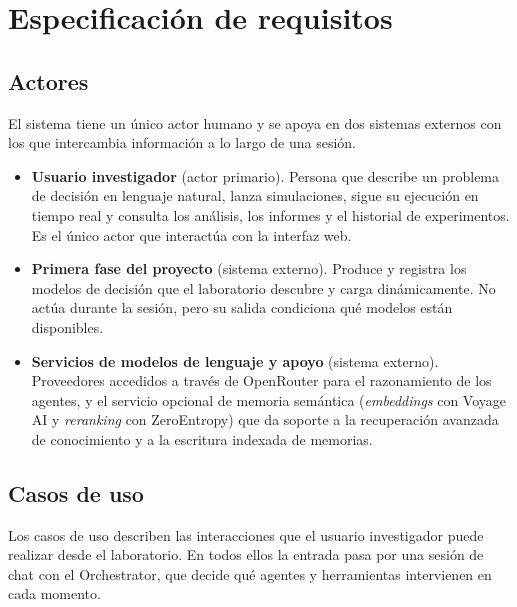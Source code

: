 \chapter{Especificación de requisitos}

\section{Actores}

El sistema tiene un único actor humano y se apoya en dos sistemas externos
con los que intercambia información a lo largo de una sesión.

\begin{itemize}
\item \textbf{Usuario investigador} (actor primario). Persona que describe
un problema de decisión en lenguaje natural, lanza simulaciones, sigue su
ejecución en tiempo real y consulta los análisis, los informes y el
historial de experimentos. Es el único actor que interactúa con la
interfaz web.
\item \textbf{Primera fase del proyecto} (sistema externo). Produce y
registra los modelos de decisión que el laboratorio descubre y carga
dinámicamente. No actúa durante la sesión, pero su salida condiciona qué
modelos están disponibles.
\item \textbf{Servicios de modelos de lenguaje y apoyo} (sistema externo).
Proveedores accedidos a través de OpenRouter para el razonamiento de los
agentes, y el servicio opcional de memoria semántica
(\textit{embeddings} con Voyage AI y \textit{reranking} con ZeroEntropy)
que da soporte a la recuperación avanzada de conocimiento y a la escritura
indexada de memorias.
\end{itemize}

\section{Casos de uso}

Los casos de uso describen las interacciones que el usuario investigador puede
realizar desde el laboratorio. En todos ellos la entrada pasa por una sesión de
chat con el Orchestrator, que decide qué agentes y herramientas intervienen en
cada momento.

